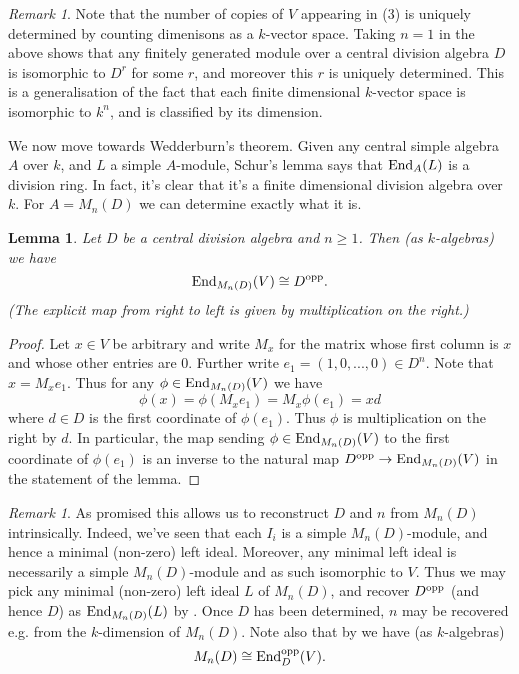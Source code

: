 \documentclass[11pt]{amsart}
\numberwithin{equation}{section}
\newtheorem{lemma}[equation]{Lemma}
\theoremstyle{remark}
\newtheorem{remark}[equation]{Remark}
\theoremstyle{remark}
\theoremstyle{remark}
\theoremstyle{definition}
\theoremstyle{definition}
\theoremstyle{definition}
\theoremstyle{definition}
\theoremstyle{definition}
\theoremstyle{definition}
\begin{document}
\begin{remark}
Note that the number of copies of $V$ appearing in (3) is uniquely determined by counting dimenisons as a $k$-vector space. Taking $n=1$ in the above shows that any finitely generated module over a central division algebra $D$ is isomorphic to $D^r$ for some $r$, and moreover this $r$ is uniquely determined. This is a generalisation of the fact that each finite dimensional $k$-vector space is isomorphic to $k^n$, and is classified by its dimension. 
\end{remark}

We now move towards Wedderburn's theorem. Given any central simple algebra $A$ over $k$, and $L$ a simple $A$-module, Schur's lemma says that $\textup{End}_A(L)$ is a division ring. In fact, it's clear that it's a finite dimensional division algebra over $k$. For $A=M_n(D)$ we can determine exactly what it is.

\begin{lemma} \label{what div alg is it}
Let $D$ be a central division algebra and $n\geq 1$. Then (as $k$-algebras) we have
\[\textup{End}_{M_n(D)}(V)\cong D^\textup{opp}.\]
(The explicit map from right to left is given by multiplication on the right.)
\end{lemma}

\begin{proof}
Let $x\in V$ be arbitrary and write $M_x$ for the matrix whose first column is $x$ and whose other entries are $0$. Further write $e_1=(1,0,...,0)\in D^n$. Note that $x=M_xe_1$. Thus for any $\phi \in \textup{End}_{M_n(D)}(V)$ we have
\[\phi(x)=\phi(M_xe_1)=M_x\phi(e_1)=xd\]
where $d\in D$ is the first coordinate of $\phi(e_1)$. Thus $\phi$ is multiplication on the right by $d$. In particular, the map sending $\phi\in \textup{End}_{M_n(D)}(V)$ to the first coordinate of $\phi(e_1)$ is an inverse to the natural map $D^\textup{opp}\rightarrow \textup{End}_{M_n(D)}(V)$ in the statement of the lemma.
\end{proof}

\begin{remark} \label{reconstruction lemma}
As promised this allows us to reconstruct $D$ and $n$ from $M_n(D)$ intrinsically. Indeed, we've seen that each $I_i$ is a simple $M_n(D)$-module, and hence a minimal (non-zero) left ideal. Moreover, any minimal left ideal is necessarily a simple $M_n(D)$-module and as such isomorphic to $V$. Thus we may pick any minimal (non-zero) left ideal $L$ of $M_n(D)$, and recover $D^\textup{opp}$ (and hence $D$) as $\textup{End}_{M_n(D)}(L)$ by . Once $D$ has been determined, $n$ may be recovered e.g. from the $k$-dimension of $M_n(D)$. Note also that by   we have (as $k$-algebras)
\[ M_n(D) \cong \textup{End}_D^{\textup{opp}}(V).\]
\end{remark}
\end{document}
